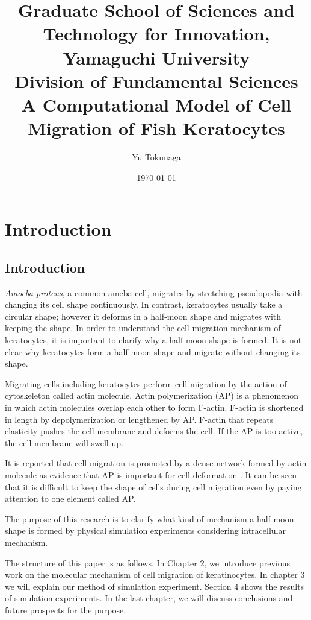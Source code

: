 \documentclass[a4paper,12pt]{book}
\title{\Large Graduate School of Sciences and Technology for Innovation, Yamaguchi University\\[1cm]
Division of Fundamental Sciences\\[3cm]
\huge A Computational Model of Cell Migration of Fish Keratocytes\\[5cm]
}
\author{Yu Tokunaga}
\date{\Large \today}
\begin{document}
\maketitle
\setcounter{page}{1}
\tableofcontents
\chapter{Introduction}
\setcounter{page}{1}
\section{Introduction}
{\it Amoeba proteus},  a common ameba cell, migrates by stretching pseudopodia with changing  its cell shape continuously.
In contrast, keratocytes usually take a circular shape; however it deforms in a half-moon shape and migrates with keeping the shape.
In order to understand the cell migration mechanism of keratocytes, it is important to clarify why a half-moon shape is formed.
It is not clear why keratocytes form a half-moon shape and migrate without changing its shape.

Migrating cells including keratocytes perform cell migration by the action of cytoskeleton called actin molecule. 
Actin polymerization (AP) is a phenomenon in which actin molecules overlap each other to form F-actin. 
F-actin is shortened in length by depolymerization or lengthened by AP.
F-actin that repeats elasticity pushes the cell membrane and deforms the cell.
If the AP is too active, the cell membrane will swell up.

It is reported that cell migration is promoted by a dense network formed by actin molecule as evidence that AP is important for cell deformation \cite{svitkina1997analysis}.
It can be seen that it is difficult to keep the shape of cells during cell migration even by paying attention to one element called AP.

The purpose of this research is to clarify what kind of mechanism a half-moon shape is formed by physical simulation experiments considering intracellular mechanism.

The structure of this paper is as follows. In Chapter 2, we introduce previous work on the molecular mechanism of cell migration of keratinocytes. In chapter 3 we will explain our method of simulation experiment. Section 4 shows the results of simulation experiments. In the last chapter, we will discuss conclusions and future prospects for the purpose.
\end{document}

